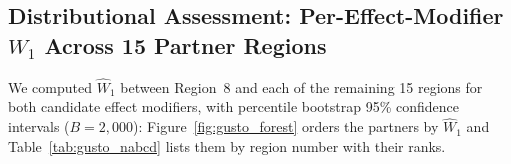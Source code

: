 \documentclass[AMA,Times1COL]{WileyNJDv5}
\begin{document}

\subsection{Distributional Assessment: Per-Effect-Modifier $W_1$ Across 15 Partner Regions}\label{sec:app_nabcd}

We computed $\widehat{W}_1$ between Region~8 and each of the remaining 15 regions for both candidate effect modifiers, with percentile bootstrap 95\% confidence intervals ($B = 2{,}000$): Figure~\ref{fig:gusto_forest} orders the partners by $\widehat{W}_1$ and Table~\ref{tab:gusto_nabcd} lists them by region number with their ranks.
\end{document}

